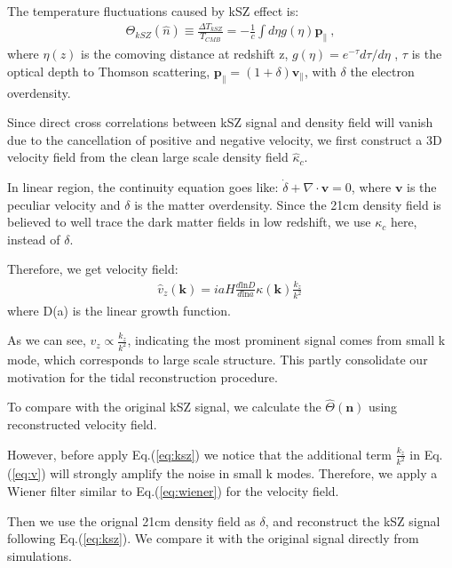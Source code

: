\indent
The temperature fluctuations caused by kSZ effect is:
\begin{eqnarray}
\label{eq:ksz}
\Theta_{kSZ}(\hat n)\equiv\frac{\Delta T_{kSZ}}{T_{CMB}}
=-\frac{1}{c}\int d\eta  g(\eta)  \bm{p}_\parallel\ ,
\end{eqnarray}
where $\eta(z)$ is the comoving distance at redshift z, $g(\eta)=e^{-\tau} d\tau/d\eta$ , $\tau$ is the optical depth to Thomson scattering, $\bm{p}_\parallel=(1+\delta)\bm{v}_\parallel$, with $\delta$ the electron overdensity. 

Since direct cross correlations between kSZ signal and density field will vanish due to the cancellation of positive and negative velocity, we first construct a 3D velocity field\cite{Shao11} from the clean large scale density field $\hat\kappa_c$.

In linear region, the continuity equation goes like:
$\dot \delta+\nabla \cdot \bm{v}=0$, 
where $\bm{v}$ is the peculiar velocity and $\delta$ is the matter overdensity. 
Since the 21cm density field is believed to well trace the dark matter fields in low redshift, we use $\kappa_c$ here, instead of $\delta$.

Therefore, we get velocity field:
\begin{eqnarray}
	\label{eq:v}
\hat v_z(\bm{k})=i a H \frac{d\mathrm{ln}D}{d\mathrm{ln}a}\kappa(\bm{k})\frac{k_z}{k^2}\,
\end{eqnarray}
where D(a) is the linear growth function.

As we can see, $v_z \propto \frac{k_z}{k^2}$, indicating the most prominent signal comes from small k mode, which corresponds to large scale structure. This partly consolidate our motivation for the tidal reconstruction procedure.

To compare with the original kSZ signal, we calculate the $\hat\Theta(\bm{n})$ using reconstructed velocity field. 

However, before apply Eq.(\ref{eq:ksz}) we notice that the additional term $\frac{k_z}{k^2}$ in Eq.(\ref{eq:v})
will strongly amplify the noise in small k modes. Therefore, we apply a Wiener filter similar to Eq.(\ref{eq:wiener}) for the velocity field.

Then we use the orignal 21cm density field as $\delta$, 
and reconstruct the kSZ signal following Eq.(\ref{eq:ksz}). 
We compare it with the original signal directly from simulations.


